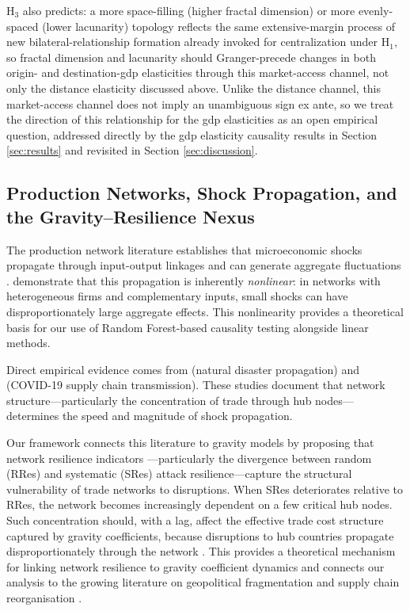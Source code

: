 \documentclass[preprint, 3p,
authoryear]{elsarticle} %
\begin{document}
H\(_3\) also predicts: a more space-filling (higher fractal dimension)
or more evenly-spaced (lower lacunarity) topology reflects the same
extensive-margin process of new bilateral-relationship formation already
invoked for centralization under H\(_1\), so fractal dimension and
lacunarity should Granger-precede changes in both origin- and
destination-\gls{gdp} elasticities through this market-access channel,
not only the distance elasticity discussed above. Unlike the distance
channel, this market-access channel does not imply an unambiguous sign
ex ante, so we treat the direction of this relationship for the
\gls{gdp} elasticities as an open empirical question, addressed directly
by the \gls{gdp} elasticity causality results in Section
\ref{sec:results} and revisited in Section \ref{sec:discussion}.

\subsection{Production Networks, Shock Propagation, and the
Gravity--Resilience Nexus}\label{subsec:theory_resilience}

The production network literature establishes that microeconomic shocks
propagate through input-output linkages and can generate aggregate
fluctuations
\citep{acemoglu2012, baqaee2019macroeconomic, carvalho2014}.
\citet{baqaee2019macroeconomic} demonstrate that this propagation is
inherently \textit{nonlinear}: in networks with heterogeneous firms and
complementary inputs, small shocks can have disproportionately large
aggregate effects. This nonlinearity provides a theoretical basis for
our use of Random Forest-based causality testing alongside linear
methods.

Direct empirical evidence comes from \citet{boehm2019} (natural disaster
propagation) and \citet{bonadio2021} (COVID-19 supply chain
transmission). These studies document that network
structure---particularly the concentration of trade through hub
nodes---determines the speed and magnitude of shock propagation.

Our framework connects this literature to gravity models by proposing
that network resilience indicators ---particularly the divergence
between random (RRes) and systematic (SRes) attack resilience---capture
the structural vulnerability of trade networks to disruptions. When SRes
deteriorates relative to RRes, the network becomes increasingly
dependent on a few critical hub nodes. Such concentration should, with a
lag, affect the effective trade cost structure captured by gravity
coefficients, because disruptions to hub countries propagate
disproportionately through the network \citep{carvalho2021}. This
provides a theoretical mechanism for linking network resilience to
gravity coefficient dynamics and connects our analysis to the growing
literature on geopolitical fragmentation and supply chain reorganisation
\citep{alfaro2023reallocation, freund2024supply}.
\end{document}
